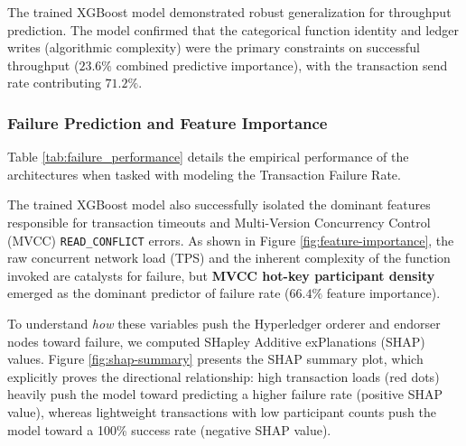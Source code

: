 \documentclass[12pt]{article}
\begin{document}
The trained XGBoost model demonstrated robust generalization for throughput prediction. The model confirmed that the categorical function identity and ledger writes (algorithmic complexity) were the primary constraints on successful throughput ($23.6\%$ combined predictive importance), with the transaction send rate contributing $71.2\%$.

\subsubsection{Failure Prediction and Feature Importance}
Table \ref{tab:failure_performance} details the empirical performance of the architectures when tasked with modeling the Transaction Failure Rate.

\begin{table}[ht]
\centering
\caption{Comparative Predictive Performance (Target: Transaction Failure Rate)}
\label{tab:failure_performance}
\end{table}

The trained XGBoost model also successfully isolated the dominant features responsible for transaction timeouts and Multi-Version Concurrency Control (MVCC) \texttt{READ\_CONFLICT} errors. As shown in Figure \ref{fig:feature-importance}, the raw concurrent network load (TPS) and the inherent complexity of the function invoked are catalysts for failure, but \textbf{MVCC hot-key participant density} emerged as the dominant predictor of failure rate ($66.4\%$ feature importance).

To understand \textit{how} these variables push the Hyperledger orderer and endorser nodes toward failure, we computed SHapley Additive exPlanations (SHAP) values. Figure \ref{fig:shap-summary} presents the SHAP summary plot, which explicitly proves the directional relationship: high transaction loads (red dots) heavily push the model toward predicting a higher failure rate (positive SHAP value), whereas lightweight transactions with low participant counts push the model toward a 100\% success rate (negative SHAP value).
\end{document}
